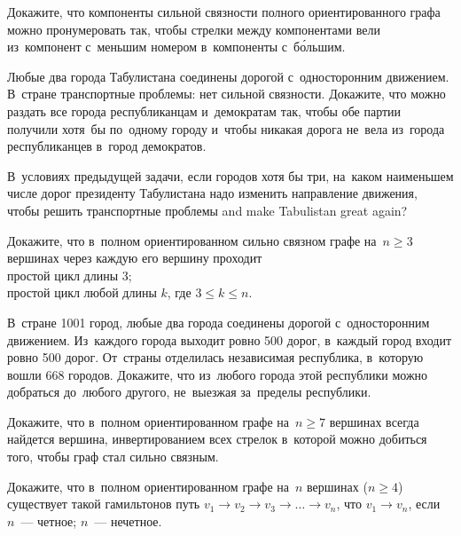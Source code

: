 \begin{problems}

\item
Докажите, что компоненты сильной связности полного ориентированного графа можно
пронумеровать так, чтобы стрелки между компонентами вели из~компонент с~меньшим
номером в~компоненты с~б\'{о}льшим.

\item
Любые два города Табулистана соединены дорогой с~односторонним движением.
В~стране транспортные проблемы: нет сильной связности.
Докажите, что можно раздать все города республиканцам и~демократам так, чтобы
обе партии получили хотя~бы по~одному городу и~чтобы никакая дорога не~вела
из~города республиканцев в~город демократов.

\item
В~условиях предыдущей задачи, если городов хотя бы три, на~каком наименьшем
числе дорог президенту Табулистана надо изменить направление движения, чтобы
решить транспортные проблемы and make Tabulistan great again?

\item
Докажите, что в~полном ориентированном сильно связном графе на~$n \geq 3$
вершинах через каждую его вершину проходит
\\
\subproblem простой цикл длины $3$;
\\
\subproblem простой цикл любой длины $k$, где $3 \leq k \leq n$.

\item
В~стране 1001 город, любые два города соединены дорогой с~односторонним
движением.
Из~каждого города выходит ровно 500 дорог, в~каждый город входит ровно 500
дорог.
От~страны отделилась независимая республика, в~которую вошли 668 городов.
Докажите, что из~любого города этой республики можно добраться до~любого
другого, не~выезжая за~пределы республики.

\item
Докажите, что в~полном ориентированном графе на~$n \geq 7$ вершинах всегда
найдется вершина, инвертированием всех стрелок в~которой можно добиться того,
чтобы граф стал сильно связным.

\item
Докажите, что в~полном ориентированном графе на~$n$ вершинах ($n \geq 4$)
существует такой гамильтонов путь $v_1 \to v_2 \to v_3 \to \ldots \to v_{n}$,
что $v_{1} \to v_{n}$, если
\\
\subproblem $n$~--- четное;
\qquad
\subproblem $n$~--- нечетное.



\end{problems}

